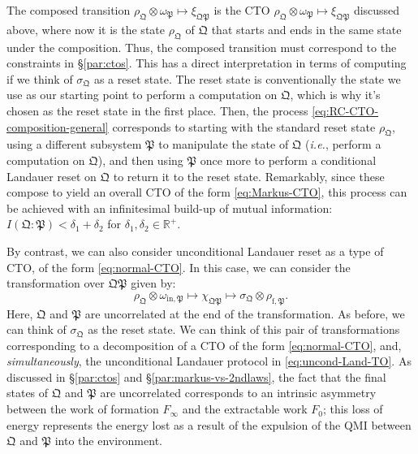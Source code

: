 \documentclass[preprints,article,accept,moreauthors,pdftex]{Definitions/mdpi}
\begin{document}
\begin{paracol}{2}
The composed transition $\rho_{\mathfrak{Q}} \otimes \omega_{\mathfrak{P}} \mapsto \xi_{\mathfrak{QP}}$ is the CTO $\rho_{\mathfrak{Q}} \otimes \omega_{\mathfrak{P}} \mapsto \xi_{\mathfrak{QP}}$ discussed above, where now it is the state $\rho_{\mathfrak{Q}}$ of $\mathfrak{Q}$ that starts and ends in the same state under the composition. Thus, the composed transition must correspond to the constraints in \S\ref{par:ctos}. This has a direct interpretation in terms of computing if we think of $\sigma_{\mathfrak{Q}}$ as a reset state. The reset state is conventionally the state we use as our starting point to perform a computation on $\mathfrak{Q}$, which is why it's chosen as the reset state in the first place. Then, the process \eqref{eq:RC-CTO-composition-general} corresponds to starting with the standard reset state $\rho_{\mathfrak{Q}}$, using a different subsystem $\mathfrak{P}$ to manipulate the state of $\mathfrak{Q}$ (\emph{i.e.}, perform a computation on $\mathfrak{Q}$), and then using $\mathfrak{P}$ once more to perform a conditional Landauer reset on $\mathfrak{Q}$ to return it to the reset state. Remarkably, since these compose to yield an overall CTO of the form \eqref{eq:Markus-CTO}, this process can be achieved with an infinitesimal build-up of mutual information:  $I\left(\mathfrak{Q}:\mathfrak{P}\right) < \delta_{1} + \delta_{2}$ for $\delta_{1}, \delta_{2} \in \mathbb{R}^{+}$.

By contrast, we can also consider unconditional Landauer reset as a type of CTO, of the form \eqref{eq:normal-CTO}. In this case, we can consider the transformation over $\mathfrak{QP}$ given by: 
\begin{equation}
    \label{eq:not-RC-CTO-composition-general}
    \rho_{\mathfrak{Q}}\otimes\omega_{\mathrm{in},\mathfrak{P}} \mapsto \chi_{\mathfrak{QP}} \mapsto \sigma_{\mathfrak{Q}}\otimes\rho_{\mathrm{f},\mathfrak{P}}.
\end{equation}
Here, $\mathfrak{Q}$ and $\mathfrak{P}$ are uncorrelated at the end of the transformation. As before, we can think of $\sigma_{\mathfrak{Q}}$ as the reset state. We can think of this pair of transformations corresponding to a decomposition of a CTO of the form \eqref{eq:normal-CTO}, and, \emph{simultaneously}, the unconditional Landauer protocol in \eqref{eq:uncond-Land-TO}. As discussed in \S\ref{par:ctos} and \S\ref{par:markus-vs-2ndlaws}, the fact that the final states of $\mathfrak{Q}$ and $\mathfrak{P}$ are uncorrelated corresponds to an intrinsic asymmetry between the work of formation $F_{\infty}$ and the extractable work $F_{0}$; this loss of energy represents the energy lost as a result of the expulsion of the QMI between $\mathfrak{Q}$ and $\mathfrak{P}$ into the environment.


\end{paracol}
\end{document}
